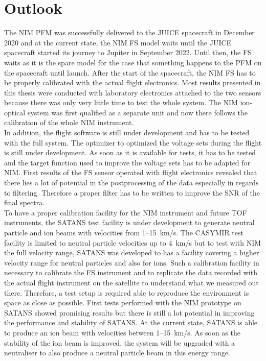 \section{Outlook}
	
	 The NIM PFM was successfully delivered to the JUICE spacecraft in December 2020 and at the current state, the NIM FS model waits until the JUICE spacecraft started its journey to Jupiter in September 2022. Until then, the FS waits as it is the spare model for the case that something happens to the PFM on the spacecraft until launch. After the start of the spacecraft, the NIM FS has to be properly calibrated with the actual flight electronics. Most results presented in this thesis were conducted with laboratory electronics attached to the two sensors because there was only very little time to test the whole system. The NIM ion-optical system was first qualified as a separate unit and now there follows the calibration of the whole NIM instrument.\\
	In addition, the flight software is still under development and has to be tested with the full system. The optimizer to optimized the voltage sets during the flight is still under development. As soon as it is available for tests, it has to be tested and the target function used to improve the voltage sets has to be adapted for NIM. First results of the FS sensor operated with flight electronics revealed that there lies a lot of potential in the postprocessing of the data especially in regards to filtering. Therefore a proper filter has to be written to improve the SNR of the final spectra.\\
	To have a proper calibration facility for the NIM instrument and future TOF instruments, the SATANS test facility is under development to generate neutral particle and ion beams with velocities from 1--15~km/s. The CASYMIR test facility is limited to neutral particle velocities up to 4~km/s but to test with NIM the full velocity range, SATANS was developed to has a facility covering a higher velocity range for neutral particles and also for ions. Such a calibration facility in necessary to calibrate the FS instrument and to replicate the data recorded with the actual flight instrument on the satellite to understand what we measured out there. Therefore, a test setup is required able to reproduce the environment is space as close as possible. First tests performed with the NIM prototype on SATANS showed promising results \cite{SATANS_Meyer2018} but there is still a lot potential in improving the performance and stability of SATANS. At the current state, SATANS is able to produce an ion beam with velocities between 1--15~km/s. As soon as the stability of the ion beam is improved, the system will be upgraded with a neutraliser to also produce a neutral particle beam in this energy range.
	
	
	
	